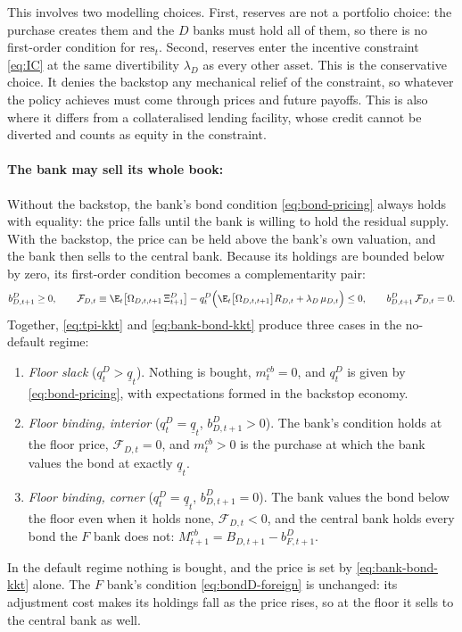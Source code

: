 This involves two modelling choices. First, reserves are not a portfolio choice:
the purchase creates them and the $D$ banks must hold all of them, so there is no
first-order condition for $\mathrm{res}_t$. Second, reserves enter the incentive
constraint \eqref{eq:IC} at the same divertibility $\lambda_D$ as every other
asset. This is the conservative choice. It denies the backstop any mechanical
relief of the constraint, so whatever the policy achieves must come through
prices and future payoffs. This is also where it differs from a collateralised
lending facility, whose credit cannot be diverted and counts as equity in the
constraint.

\paragraph{The bank may sell its whole book:}
Without the backstop, the bank's bond condition \eqref{eq:bond-pricing} always
holds with equality: the price falls until the bank is willing to hold the
residual supply. With the backstop, the price can be held above the bank's own
valuation, and the bank then sells to the central bank. Because its holdings are
bounded below by zero, its first-order condition becomes a complementarity pair:
\begin{equation}
b^{D}_{D,t+1}\ge0,
\qquad
\mathcal{F}_{D,t}\equiv
\E_t\bigl[\Omega_{D,t,t+1}\,\Xi^{D}_{t+1}\bigr]
-q^{D}_t\Bigl(\E_t\bigl[\Omega_{D,t,t+1}\bigr]R_{D,t}+\lambda_D\,\mu_{D,t}\Bigr)\le0,
\qquad
b^{D}_{D,t+1}\,\mathcal{F}_{D,t}=0 .
\label{eq:bank-bond-kkt}
\end{equation}
Together, \eqref{eq:tpi-kkt} and \eqref{eq:bank-bond-kkt} produce three cases in
the no-default regime:
\begin{enumerate}
\item \emph{Floor slack} ($q^{D}_t>\underline q_t$). Nothing is bought,
  $m^{cb}_t=0$, and $q^{D}_t$ is given by \eqref{eq:bond-pricing}, with
  expectations formed in the backstop economy.
\item \emph{Floor binding, interior} ($q^{D}_t=\underline q_t$,
  $b^{D}_{D,t+1}>0$). The bank's condition holds at the floor price,
  $\mathcal{F}_{D,t}=0$, and $m^{cb}_t>0$ is the purchase at which the bank values
  the bond at exactly $\underline q_t$.
\item \emph{Floor binding, corner} ($q^{D}_t=\underline q_t$,
  $b^{D}_{D,t+1}=0$). The bank values the bond below the floor even when it holds
  none, $\mathcal{F}_{D,t}<0$, and the central bank holds every bond the $F$ bank
  does not: $M^{cb}_{t+1}=B_{D,t+1}-b^{D}_{F,t+1}$.
\end{enumerate}
In the default regime nothing is bought, and the price is set by
\eqref{eq:bank-bond-kkt} alone. The $F$ bank's condition \eqref{eq:bondD-foreign}
is unchanged: its adjustment cost makes its holdings fall as the price rises, so
at the floor it sells to the central bank as well.

